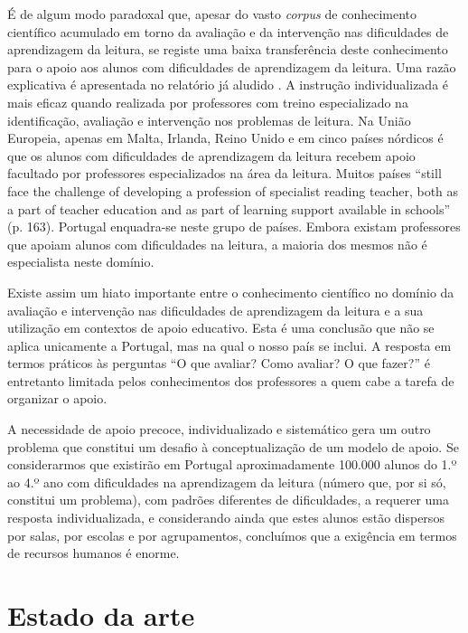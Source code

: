 \documentclass[
  oneside,
  11pt, a4paper,
  footinclude=true,
  headinclude=true,
  cleardoublepage=empty
]{scrbook}
\begin{document}
É de algum modo paradoxal que, apesar do vasto {\it corpus} de conhecimento científico acumulado em torno da avaliação e da intervenção nas dificuldades de aprendizagem da leitura, se registe uma baixa transferência deste conhecimento para o apoio aos alunos com dificuldades de aprendizagem da leitura. Uma razão explicativa é apresentada no relatório já aludido \citep{European}. A instrução individualizada é mais eficaz quando realizada por professores com treino especializado na identificação, avaliação e intervenção nos problemas de leitura. Na União Europeia, apenas em Malta, Irlanda, Reino Unido e em cinco países nórdicos é que os alunos com dificuldades de aprendizagem da leitura recebem apoio facultado por professores especializados na área da leitura. Muitos países “still face the challenge of developing a profession of specialist reading teacher, both as a part of teacher education and as part of learning support available in schools” (p. 163). Portugal enquadra-se neste grupo de países. Embora existam professores que apoiam alunos com dificuldades na leitura, a maioria dos mesmos não é especialista neste domínio.

Existe assim um hiato importante entre o conhecimento científico no domínio da avaliação e intervenção nas dificuldades de aprendizagem da leitura e a sua utilização em contextos de apoio educativo. Esta é uma conclusão que não se aplica unicamente a Portugal, mas na qual o nosso país se inclui. A resposta em termos práticos às perguntas “O que avaliar? Como avaliar? O que fazer?” é entretanto limitada pelos conhecimentos dos professores a quem cabe a tarefa de organizar o apoio.

A necessidade de apoio precoce, individualizado e sistemático gera um outro problema que constitui um desafio à conceptualização de um modelo de apoio. Se considerarmos que existirão em Portugal aproximadamente 100.000 alunos do 1.º ao 4.º ano com dificuldades na aprendizagem da leitura (número que, por si só, constitui um problema), com padrões diferentes de dificuldades, a requerer uma resposta individualizada, e considerando ainda que estes alunos estão dispersos por salas, por escolas e por agrupamentos, concluímos que a exigência em termos de recursos humanos é enorme.

\chapter{Estado da arte}
\end{document}
